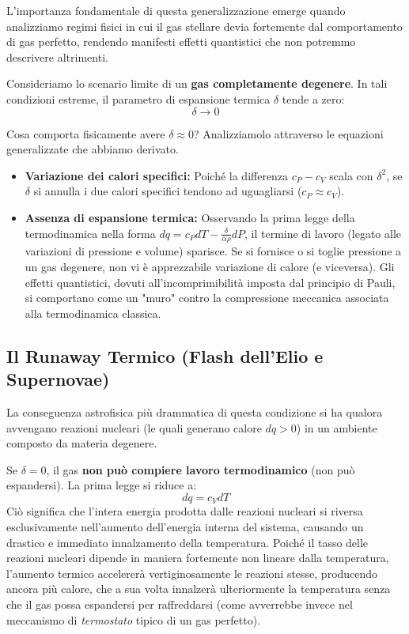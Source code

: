 L'importanza fondamentale di questa generalizzazione emerge quando analizziamo regimi fisici in cui il gas stellare devia fortemente dal comportamento di gas perfetto, rendendo manifesti effetti quantistici che non potremmo descrivere altrimenti.

Consideriamo lo scenario limite di un \textbf{gas completamente degenere}. In tali condizioni estreme, il parametro di espansione termica $\delta$ tende a zero:
\begin{equation}
\delta \to 0
\end{equation}

Cosa comporta fisicamente avere $\delta \approx 0$? Analizziamolo attraverso le equazioni generalizzate che abbiamo derivato.
\begin{itemize}
\item \textbf{Variazione dei calori specifici:} Poiché la differenza $c_P - c_V$ scala con $\delta^2$, se $\delta$ si annulla i due calori specifici tendono ad uguagliarsi ($c_P \approx c_V$).
\item \textbf{Assenza di espansione termica:} Osservando la prima legge della termodinamica nella forma $dq = c_P dT - \frac{\delta}{\alpha \rho} dP$, il termine di lavoro (legato alle variazioni di pressione e volume) sparisce. Se si fornisce o si toglie pressione a un gas degenere, non vi è apprezzabile variazione di calore (e viceversa). Gli effetti quantistici, dovuti all'incomprimibilità imposta dal principio di Pauli, si comportano come un "muro" contro la compressione meccanica associata alla termodinamica classica.
\end{itemize}

\subsection{Il Runaway Termico (Flash dell'Elio e Supernovae)}
La conseguenza astrofisica più drammatica di questa condizione si ha qualora avvengano reazioni nucleari (le quali generano calore $dq > 0$) in un ambiente composto da materia degenere.

Se $\delta = 0$, il gas \textbf{non può compiere lavoro termodinamico} (non può espandersi). La prima legge si riduce a:
\begin{equation}
dq = c_V dT
\end{equation}
Ciò significa che l'intera energia prodotta dalle reazioni nucleari si riversa esclusivamente nell'aumento dell'energia interna del sistema, causando un drastico e immediato innalzamento della temperatura. Poiché il tasso delle reazioni nucleari dipende in maniera fortemente non lineare dalla temperatura, l'aumento termico accelererà vertiginosamente le reazioni stesse, producendo ancora più calore, che a sua volta innalzerà ulteriormente la temperatura senza che il gas possa espandersi per raffreddarsi (come avverrebbe invece nel meccanismo di \textit{termostato} tipico di un gas perfetto).

